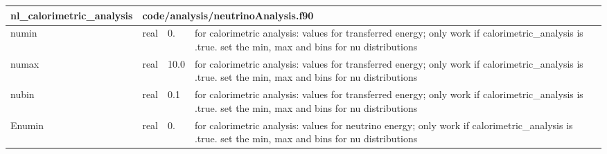 \documentclass{article}
\begin{document}

\begin{longtable}{llll}
\toprule
\textbf{\large{nl\_calorimetric\_analysis}} & \multicolumn{3}{l}{\footnotesize{code/analysis/neutrinoAnalysis.f90}}\\*
\midrule
\endfirsthead
\midrule
\endhead
numin & \begin{minipage}[t]{2cm}real\end{minipage} & \begin{minipage}[t]{2cm}0.\end{minipage} & \begin{minipage}[t]{12cm}for calorimetric analysis: values for transferred energy; only work if calorimetric\_analysis is .true. set the min, max and bins for nu distributions\end{minipage}\\*
\midrule
numax & \begin{minipage}[t]{2cm}real\end{minipage} & \begin{minipage}[t]{2cm}10.0\end{minipage} & \begin{minipage}[t]{12cm}for calorimetric analysis: values for transferred energy; only work if calorimetric\_analysis is .true. set the min, max and bins for nu distributions\end{minipage}\\*
\midrule
nubin & \begin{minipage}[t]{2cm}real\end{minipage} & \begin{minipage}[t]{2cm}0.1\end{minipage} & \begin{minipage}[t]{12cm}for calorimetric analysis: values for transferred energy; only work if calorimetric\_analysis is .true. set the min, max and bins for nu distributions\end{minipage}\\*
\midrule
Enumin & \begin{minipage}[t]{2cm}real\end{minipage} & \begin{minipage}[t]{2cm}0.\end{minipage} & \begin{minipage}[t]{12cm}for calorimetric analysis: values for neutrino energy; only work if calorimetric\_analysis is .true. set the min, max and bins for nu distributions\end{minipage}\\*

\end{longtable}
\end{document}
